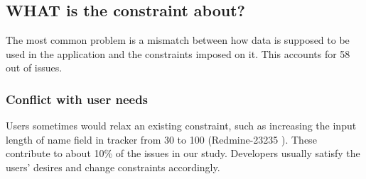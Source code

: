 \subsection{WHAT is the constraint about?}
\label{subsec:what}
The most common problem is a mismatch between how data is supposed to be used in the application and the constraints imposed on it. This accounts for 
58 out of \numissues issues. 


\subsubsection{{Conflict with user needs}}

Users sometimes would relax an existing constraint,
such as increasing the input length of name field in tracker from 30 to 100 (Redmine-23235 \cite{redmine-25235}).
These contribute to about 10\% of the issues in our study.
Developers usually satisfy the users' desires and change constraints
accordingly. 

